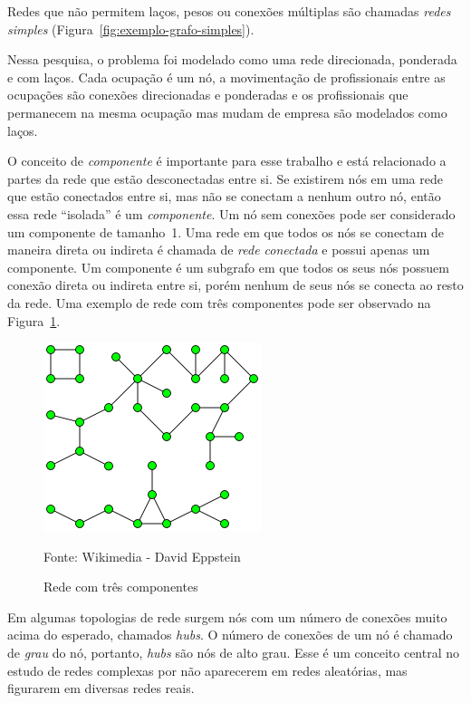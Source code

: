 \documentclass[12pt,a4paper]{article}
\newcommand{\source}[1]{\vspace{-10pt} \caption*{Fonte: {#1}} }
\begin{document}
Redes que não permitem laços, pesos ou conexões múltiplas são chamadas \textit{redes simples} (Figura~\ref{fig:exemplo-grafo-simples}).

Nessa pesquisa, o problema foi modelado como uma rede direcionada, ponderada e com laços. Cada ocupação é um nó, a movimentação de profissionais entre as ocupações são conexões direcionadas e ponderadas e os profissionais que permanecem na mesma ocupação mas mudam de empresa são modelados como laços.

O conceito de \textit{componente} é importante para esse trabalho e está relacionado a partes da rede que estão desconectadas entre si. Se existirem nós em uma rede que estão conectados entre si, mas não se conectam a nenhum outro nó, então essa rede \enquote{isolada} é um \textit{componente}. Um nó sem conexões pode ser considerado um componente de tamanho~1. Uma rede em que todos os nós se conectam de maneira direta ou indireta é chamada de \textit{rede conectada} e possui apenas um componente. Um componente é um subgrafo em que todos os seus nós possuem conexão direta ou indireta entre si, porém nenhum de seus nós se conecta ao resto da rede. Uma exemplo de rede com três componentes pode ser observado na Figura~\ref{fig:exemplo-componente}.

\begin{figure}[ht]
    \centering
    \includegraphics[scale=0.7]{componente.png}
    \caption{Rede com três componentes}
    \source{Wikimedia - David Eppstein}
    \label{fig:exemplo-componente}
\end{figure}

Em algumas topologias de rede surgem nós com um número de conexões muito acima do esperado, chamados \textit{hubs}. O número de conexões de um nó é chamado de \textit{grau} do nó, portanto, \textit{hubs} são nós de alto grau. Esse é um conceito central no estudo de redes complexas por não aparecerem em redes aleatórias, mas figurarem em diversas redes reais.
\end{document}
